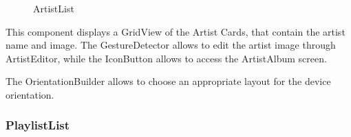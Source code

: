\documentclass{article}
\begin{document}
\begin{figure}[H]
	\noindent
	\caption{ArtistList} 
\end{figure}

This component displays a GridView of the Artist Cards, that contain the artist
name and image. The GestureDetector allows to edit the artist image through
ArtistEditor, while the IconButton allows to access the ArtistAlbum screen.

The OrientationBuilder allows to choose an appropriate layout for the device
orientation.

\subsubsection{PlaylistList}
\end{document}

